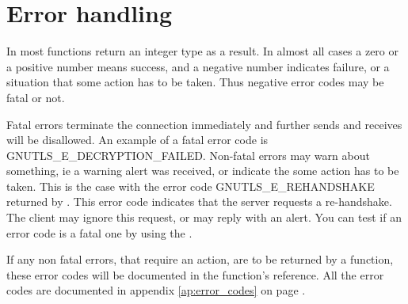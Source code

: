 \section{Error handling}
\par
In \gnutls{} most functions return an integer type as a result.
In almost all cases a zero or a positive number means success, and
a negative number indicates failure, or a situation that some
action has to be taken. Thus negative error codes may be fatal
or not. 
\par 
Fatal errors terminate the connection immediately and
further sends and receives will be disallowed. An example of
a fatal error code is GNUTLS\_E\_DECRYPTION\_FAILED. Non-fatal errors
may warn about something, ie a warning alert was received, or
indicate the some action has to be taken. This is the case with
the error code GNUTLS\_E\_REHANDSHAKE returned by 
.
This error code indicates that the server requests a re-handshake. The client
may ignore this request, or may reply with an alert.
You can test if an error code is a fatal one by using the
.
\par
If any non fatal errors, that require an action, are to be returned by a
function, these error codes will be documented
in the function's reference. All the error codes are documented
in appendix \ref{ap:error_codes} on page \pageref{ap:error_codes}.


